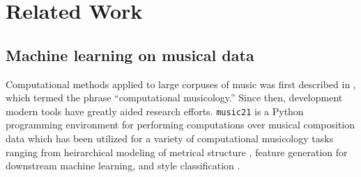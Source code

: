 \documentclass[dissertation.tex]{subfiles}
\begin{document}
\chapter{Related Work}




\section{Machine learning on musical data}

Computational methods applied to large corpuses of music was first described in
\cite{coutinho2005computational}, which termed the phrase ``computational
musicology.'' Since then, development modern tools have greatly aided research
efforts. \texttt{music21} \cite{Scott2015} is a Python programming environment
for performing computations over musical composition data which has been
utilized for a variety of computational musicology tasks ranging from
heirarchical modeling of metrical structure \cite{ariza2010modeling}, feature
generation for downstream machine learning\cite{Cuthbert2011}, and style
classification \cite{Herlands2014}.
\end{document}

